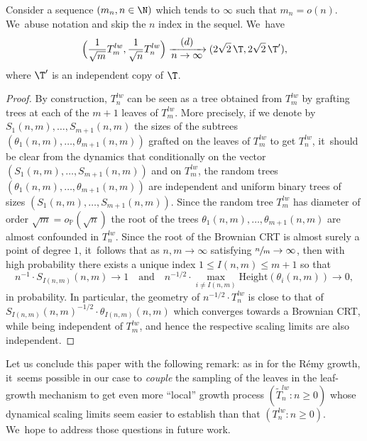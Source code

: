 \begin{prop}\label{prop:pairedindep}
Consider a sequence $(m_n,n\in\N)$ which tends to $\infty$ such that $m_n=o(n)$. We~abuse notation and skip the $n$ index in the sequel. We~have
\[
\Bigl(\frac{1}{\sqrt{m}}T^{lw}_m,\frac{1}{\sqrt{n}}T^{lw}_n\Bigr) \xrightarrow[\textstyle n\to\infty]{\textstyle(d)} (2\sqrt{2}\,\T,2\sqrt{2}\,\T'),
\]
where $\T'$ is an independent copy of $\T$.
\end{prop}

\begin{proof} By construction, $T^{lw}_n$ can be seen as a tree obtained from $T^{lw}_m$ by grafting trees at each of the $m+1$ leaves of $T^{lw}_m$. More precisely, if we denote by $S_1(n,m),\dots , S_{m+1}(n,m)$ the sizes of the subtrees $(\theta_1(n,m), \dots , \theta_{m+1}(n,m))$ grafted on the leaves of $T^{lw}_m$ to get $T^{lw}_n$, it~should be clear from the dynamics that conditionally on the vector $(S_1(n,m), \dots , S_{m+1}(n,m))$ and on $T^{lw}_m$, the random trees $(\theta_1(n,m), \dots , \theta_{m+1}(n,m))$ are independent and uniform binary trees of sizes $(S_1(n,m), \dots , S_{m+1}(n,m))$. Since the random tree $T^{lw}_m$ has diameter of order $ \sqrt{m} = o_{\mathbb{P}}(\sqrt{n})$ the root of the trees $\theta_1(n,m), \dots , \theta_{m+1}(n,m)$ are almost confounded in $T^{lw}_n$. Since the root of the Brownian CRT is almost surely a point of degree $1$, it~follows that as $n,m \to \infty$ satisfying $ \sfrac{n}{m} \to \infty$, then with high probability there exists a unique index $1 \leq I(n,m) \leq m+1$ so that
\[
n^{-1} \cdot S_{I(n,m)}(n,m) \to 1 \quad \text{and} \quad n^{-1/2}\cdot \max_{i \ne I(n,m)} \mathrm{Height}(\theta_i(n,m)) \to 0,
\]
in probability. In particular, the geometry of $ n^{-1/2}\cdot T^{lw}_n$ is close to that of $ S_{I(n,m)}(n,m)^{-1/2}\cdot \theta_{I(n,m)}(n,m)$ which converges towards a Brownian CRT, while being independent of $T^{lw}_m$, and hence the respective scaling limits are also independent.
\end{proof}

Let us conclude this paper with the following remark: as in \cite{bacher2017efficient} for the Rémy growth, it~seems possible in our case to \textit{couple} the sampling of the leaves in the leaf-growth mechanism to get even more ``local'' growth process $(\tilde{T}_n^{lw} : n \geq 0)$ whose dynamical scaling limits seem easier to establish than that $({T}_n^{lw} : n \geq 0)$. We~hope to address those questions in future work.

\appendix

